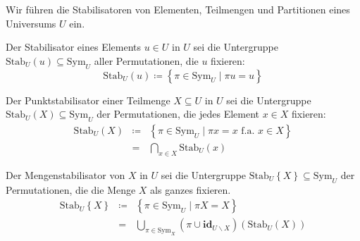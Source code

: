 Wir führen die Stabilisatoren von Elementen, Teilmengen und Partitionen
eines Universums $U$ ein.
\begin{defn}
Der Stabilisator eines Elements $u\in U$ in $U$ sei die Untergruppe
$\mathrm{Stab}_{U}\left(u\right)\subseteq\mathrm{Sym}_{U}$ aller
Permutationen, die $u$ fixieren: 
\[
\mathrm{Stab}_{U}\left(u\right)\coloneqq\left\{ \pi\in\mathrm{Sym}_{U}\mid\pi u=u\right\} 
\]

Der Punktstabilisator\textbf{ }einer Teilmenge $X\subseteq U$ in
$U$ sei die Untergruppe $\mathrm{Stab}_{U}\left(X\right)\subseteq\mathrm{Sym}_{U}$
der Permutationen, die jedes Element $x\in X$ fixieren:
\begin{eqnarray*}
\mathrm{Stab}_{U}\left(X\right) & \coloneqq & \left\{ \pi\in\mathrm{Sym}_{U}\mid\pi x=x\,\,\mathrm{f.a.}\,\,x\in X\right\} \\
 & = & \bigcap_{x\in X}\mathrm{Stab}_{U}\left(x\right)
\end{eqnarray*}

Der Mengenstabilisator von $X$ in $U$ sei die Untergruppe $\mathrm{Stab}_{U}\left\{ X\right\} \subseteq\mathrm{Sym}_{U}$
der Permutationen, die die Menge $X$ als ganzes fixieren.
\begin{eqnarray*}
\mathrm{Stab}_{U}\left\{ X\right\}  & \coloneqq & \left\{ \pi\in\mathrm{Sym}_{U}\mid\pi X=X\right\} \\
 & = & \bigcup_{\pi\in\mathrm{Sym}_{X}}\left(\pi\cup\mathbf{id}_{U\backslash X}\right)\left(\mathrm{Stab}_{U}\left(X\right)\right)
\end{eqnarray*}
\end{defn}

